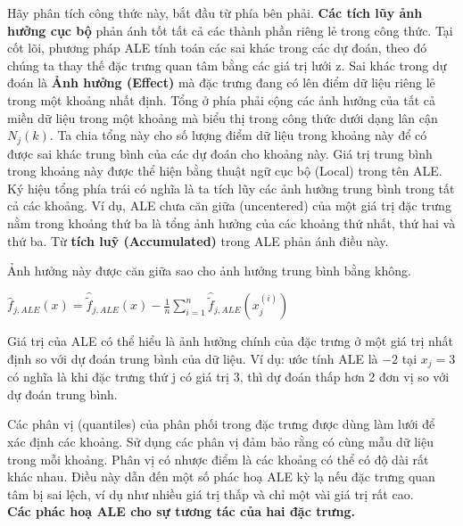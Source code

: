 Hãy phân tích công thức này, bắt đầu từ phía bên phải. \textbf{Các tích lũy ảnh hưởng cục bộ} phản ánh tốt tất cả các thành phần riêng lẻ trong công thức. Tại cốt lõi, phương pháp ALE tính toán các sai khác trong các dự đoán, theo đó chúng ta thay thế đặc trưng quan tâm bằng các giá trị lưới z. Sai khác trong dự đoán là \textbf{Ảnh hưởng (Effect)} mà đặc trưng đang có lên điểm dữ liệu riêng lẻ trong một khoảng nhất định. Tổng ở phía phải cộng các ảnh hưởng của tất cả miền dữ liệu trong một khoảng mà biểu thị trong công thức dưới dạng lân cận $N_j(k)$. Ta chia tổng này cho số lượng điểm dữ liệu trong khoảng này để có được sai khác trung bình của các dự đoán cho khoảng này. Giá trị trung bình trong khoảng này được thể hiện bằng thuật ngữ cục bộ (Local) trong tên ALE. Ký hiệu tổng phía trái có nghĩa là ta tích lũy các ảnh hưởng trung bình trong tất cả các khoảng. Ví dụ, ALE chưa căn giữa (uncentered) của một giá trị đặc trưng nằm trong khoảng thứ ba là tổng ảnh hưởng của các khoảng thứ nhất, thứ hai và thứ ba. Từ \textbf{tích luỹ (Accumulated)} trong ALE phản ánh điều này.

Ảnh hưởng này được căn giữa sao cho ảnh hưởng trung bình bằng không.


\begin{center}
$\hat{f}_{j,ALE}(x)=\hat{\tilde{f}}_{j,ALE}(x)-\frac{1}{n}\sum_{i=1}^{n}\hat{\tilde{f}}_{j,ALE}(x^{(i)}_{j})$
\end{center}

Giá trị của ALE có thể hiểu là ảnh hưởng chính của đặc trưng ở một giá trị nhất định so với dự đoán trung bình của dữ liệu. Ví dụ: ước tính ALE là $-2$ tại $x_j= 3$ có nghĩa là khi đặc trưng thứ j có giá trị 3, thì dự đoán thấp hơn 2 đơn vị so với dự đoán trung bình.


Các phân vị (quantiles) của phân phối trong đặc trưng được dùng làm lưới để xác định các khoảng. Sử dụng các phân vị đảm bảo rằng có cùng mẫu dữ liệu trong mỗi khoảng. Phân vị có nhược điểm là các khoảng có thể có độ dài rất khác nhau. Điều này dẫn đến một số phác hoạ ALE kỳ lạ nếu đặc trưng quan tâm bị sai lệch, ví dụ như nhiều giá trị thấp và chỉ một vài giá trị rất cao.\\
\textbf{Các phác hoạ ALE cho sự tương tác của hai đặc trưng.}

